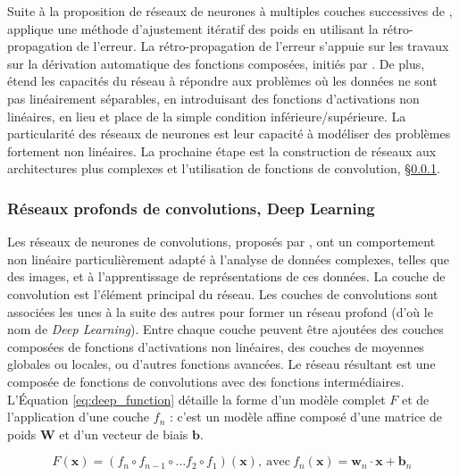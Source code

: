 Suite à la proposition de réseaux de neurones à multiples couches successives de \citeauthor{fukushima_neocognitron_1980} \cite{fukushima_neocognitron_1980}, \citeauthor{rumelhart_learning_1985} \cite{rumelhart_learning_1985} applique une méthode d'ajustement itératif des poids en utilisant la rétro-propagation de l'erreur.
La rétro-propagation de l'erreur s'appuie sur les travaux sur la dérivation automatique des fonctions composées, initiés par \citeauthor{linnainmaa_taylor_1976} \cite{linnainmaa_taylor_1976}.
De plus, \citeauthor{rumelhart_learning_1985} \cite{rumelhart_learning_1985} étend les capacités du réseau à répondre aux problèmes où les données ne sont pas linéairement séparables, en introduisant des fonctions d'activations non linéaires, en lieu et place de la simple condition inférieure/supérieure.
La particularité des réseaux de neurones est leur capacité à modéliser des problèmes fortement non linéaires.
La prochaine étape est la construction de réseaux aux architectures plus complexes et l'utilisation de fonctions de convolution, §\ref{subsubsec:deep_learning}.

\subsubsection{Réseaux profonds de convolutions, Deep Learning} \label{subsubsec:deep_learning}
Les réseaux de neurones de convolutions, proposés par \citeauthor{lecun_backpropagation_1989} \cite{lecun_backpropagation_1989}, ont un comportement non linéaire particulièrement adapté à l'analyse de données complexes, telles que des images, et à l'apprentissage de représentations de ces données.
La couche de convolution est l'élément principal du réseau.
Les couches de convolutions sont associées les unes à la suite des autres pour former un réseau profond (d'où le nom de \textit{Deep Learning}).
Entre chaque couche peuvent être ajoutées des couches composées de fonctions d'activations non linéaires, des couches de moyennes globales ou locales, ou d'autres fonctions avancées.
Le réseau résultant est une composée de fonctions de convolutions avec des fonctions intermédiaires.
L'Équation \ref{eq:deep_function} détaille la forme d'un modèle complet $F$ et de l'application d'une couche $f_n$ : c'est un modèle affine composé d'une matrice de poids $\mathbf{W}$ et d'un vecteur de biais $\mathbf{b}$.

\begin{equation} \label{eq:deep_function}
F(\mathbf{x}) = \left(f_{n} \circ f_{n-1} \circ \ldots f_{2} \circ f_{1}\right)(\mathbf{x}), \ \text{avec} \ f_n(\mathbf{x}) = \mathbf{w}_n \cdot \mathbf{x} + \mathbf{b}_n
\end{equation}

